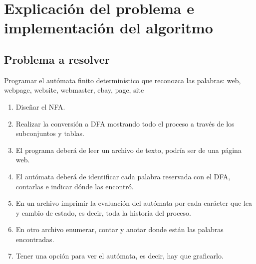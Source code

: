 \documentclass{article}
\begin{document}
\section{Explicaci\'on del problema e implementaci\'on del algoritmo}

\subsection{Problema a resolver}

Programar el autómata finito determinístico que reconozca las palabras: web, webpage, website, webmaster, ebay, page, site
\begin{enumerate}
    \item Diseñar el NFA.
    \item Realizar la conversión a DFA mostrando todo el proceso a través de los subconjuntos y tablas.
    \item El programa deberá de leer un archivo de texto, podría ser de una página web.
    \item El autómata deberá de identificar cada palabra reservada con el DFA, contarlas e indicar dónde las encontró.
    \item  En un archivo imprimir la evaluación del autómata por cada carácter que lea y cambio de estado, es decir, toda la historia del proceso.
    \item En otro archivo enumerar, contar y anotar donde están las palabras encontradas.
    \item Tener una opción para ver el autómata, es decir, hay que graficarlo.
\end{enumerate}
\end{document}
